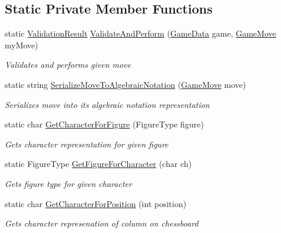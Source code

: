 \subsection*{Static Private Member Functions}
\begin{DoxyCompactItemize}
\item 
static \mbox{\hyperlink{class_chess_tracking_1_1_game_1_1_validation_result}{Validation\+Result}} \mbox{\hyperlink{class_chess_tracking_1_1_game_1_1_game_validator_a616609a52db6c7aff18286405c71e49e}{Validate\+And\+Perform}} (\mbox{\hyperlink{class_chess_tracking_1_1_game_1_1_game_data}{Game\+Data}} game, \mbox{\hyperlink{class_chess_tracking_1_1_game_1_1_game_move}{Game\+Move}} my\+Move)
\begin{DoxyCompactList}\small\item\em Validates and performs given move \end{DoxyCompactList}\item 
static string \mbox{\hyperlink{class_chess_tracking_1_1_game_1_1_game_validator_a4c5f596df3dc8967ec7c7f0330cd3d51}{Serialize\+Move\+To\+Algebraic\+Notation}} (\mbox{\hyperlink{class_chess_tracking_1_1_game_1_1_game_move}{Game\+Move}} move)
\begin{DoxyCompactList}\small\item\em Serializes move into its algebraic notation representation \end{DoxyCompactList}\item 
static char \mbox{\hyperlink{class_chess_tracking_1_1_game_1_1_game_validator_af281d5b7de0758fd82b6fefc5b0f72a9}{Get\+Character\+For\+Figure}} (Figure\+Type figure)
\begin{DoxyCompactList}\small\item\em Gets character representation for given figure \end{DoxyCompactList}\item 
static Figure\+Type \mbox{\hyperlink{class_chess_tracking_1_1_game_1_1_game_validator_a263009ed877e341ddf34a2dd2c0f4792}{Get\+Figure\+For\+Character}} (char ch)
\begin{DoxyCompactList}\small\item\em Gets figure type for given character \end{DoxyCompactList}\item 
static char \mbox{\hyperlink{class_chess_tracking_1_1_game_1_1_game_validator_a9d64f0d4215314e71ded89fa25d1cf8f}{Get\+Character\+For\+Position}} (int position)
\begin{DoxyCompactList}\small\item\em Gets character represenation of column on chessboard \end{DoxyCompactList}\item 

\end{DoxyCompactItemize}
